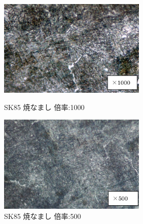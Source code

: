 \documentclass[10pt，a4j]{jsarticle}
\begin{document}
  \begin{figure}[htbp]
    \begin{minipage}{0.5\hsize}
      \begin{center}
        \includegraphics[width=7cm]{../img/S85_yakinamashi_1000.png}
        \caption{SK85 焼なまし 倍率:1000}
      \end{center}
    \end{minipage}
    \begin{minipage}{0.5\hsize}
      \begin{center}
        \includegraphics[width=7cm]{../img/SK85_yakinamashi_500.png}
        \caption{SK85 焼なまし 倍率:500}
      \end{center}
    \end{minipage}
  \end{figure}
\end{document}
